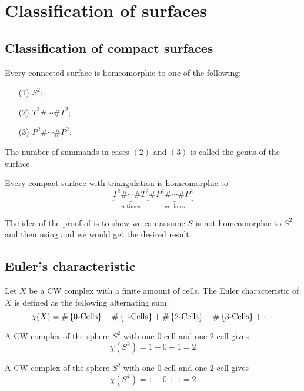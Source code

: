 \documentclass[11pt,a4paper]{article}
\begin{document}
\newpage

\section{Classification of surfaces}
\subsection{Classification of compact surfaces}


\begin{theorem}
  \label{thm:surfaces-classification}
  Every connected surface is homeomorphic to one of the following:
  \begin{enumerate}
    \item[(1)] $S^2$;
    \item[(2)] $T^2 \# \cdots \# T^2$;
    \item[(3)] $P^2 \# \cdots \# P^2$.
  \end{enumerate}
\end{theorem}
\begin{definition}[Genus]
  The number of summands in cases $(2)$ and $(3)$ is called the genus of
  the surface.
\end{definition}

\begin{theorem}
  \label{thm:classification-lemma}
  Every compact surface with triangulation is homeomorphic to
  \[
    \underbrace{T^2 \# \cdots \# T^2}_{n \text{ times}} \# 
    \underbrace{P^2 \# \cdots \# P^2}_{m \text{ times}}
  \]
\end{theorem}
The idea of the proof of  is to show
we can assume $S$ is not homeomorphic to $S^2$ and then using 
 and  we would get the
desired result.

\subsection{Euler's characteristic}
\begin{definition}
  Let $X$ be a CW complex with a finite amount of cells.
  The Euler characteristic of $X$ is defined as the following alternating
  sum:
  \[
    \chi(X)=
    \#\set{0\text-\text{Cells}} -
    \#\set{1\text-\text{Cells}} +
    \#\set{2\text-\text{Cells}} -
    \#\set{3\text-\text{Cells}} + \cdots
  \]
\end{definition}
\begin{example}
  A CW complex of the sphere $S^2$ with one $0$-cell and one $2$-cell gives
  \[
    \chi(S^2) = 1 - 0 + 1 = 2
  \]
\end{example}
\begin{example}
  A CW complex of the sphere $S^2$ with one $0$-cell and one $2$-cell gives
  \[
    \chi(S^2) = 1 - 0 + 1 = 2
  \]
\end{example}




\end{document}
